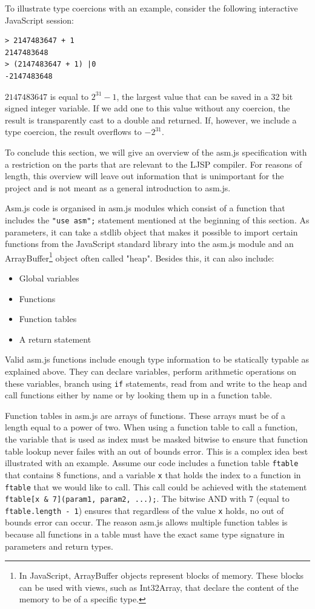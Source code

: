 \documentclass[11pt]{report}
\begin{document}
To illustrate type coercions with an example, consider the following interactive JavaScript session:

\begin{lstlisting}
> 2147483647 + 1
2147483648
> (2147483647 + 1) |0
-2147483648
\end{lstlisting}

$2147483647$ is equal to $2^{31}-1$, the largest value that can be saved in a 32 bit signed integer variable. If we add one to this value without any coercion, the result is transparently cast to a double and returned. If, however, we include a type coercion, the result overflows to $-2^{31}$.

To conclude this section, we will give an overview of the asm.js specification with a restriction on the parts that are relevant to the LJSP compiler. For reasons of length, this overview will leave out information that is unimportant for the project and is not meant as a general introduction to asm.js.

Asm.js code is organised in asm.js modules which consist of a function that includes the \texttt{"use asm";} statement mentioned at the beginning of this section. As parameters, it can take a stdlib object that makes it possible to import certain functions from the JavaScript standard library into the asm.js module and an ArrayBuffer\footnote{In JavaScript, ArrayBuffer objects represent blocks of memory. These blocks can be used with views, such as Int32Array, that declare the content of the memory to be of a specific type.} object often called "heap". Besides this, it can also include:
\begin{itemize}
\item Global variables
\item Functions
\item Function tables
\item A return statement
\end{itemize}

Valid asm.js functions include enough type information to be statically typable as explained above. They can declare variables, perform arithmetic operations on these variables, branch using \texttt{if} statements, read from and write to the heap and call functions either by name or by looking them up in a function table.

Function tables in asm.js are arrays of functions. These arrays must be of a length equal to a power of two. When using a function table to call a function, the variable that is used as index must be masked bitwise to ensure that function table lookup never failes with an out of bounds error. This is a complex idea best illustrated with an example. Assume our code includes a function table \texttt{ftable} that contains $8$ functions, and a variable \texttt{x} that holds the index to a function in \texttt{ftable} that we would like to call. This call could be achieved with the statement \texttt{ftable[x \& 7](param1, param2, ...);}. The bitwise AND with $7$ (equal to \texttt{ftable.length - 1}) ensures that regardless of the value \texttt{x} holds, no out of bounds error can occur. The reason asm.js allows multiple function tables is because all functions in a table must have the exact same type signature in parameters and return types.
\end{document}
